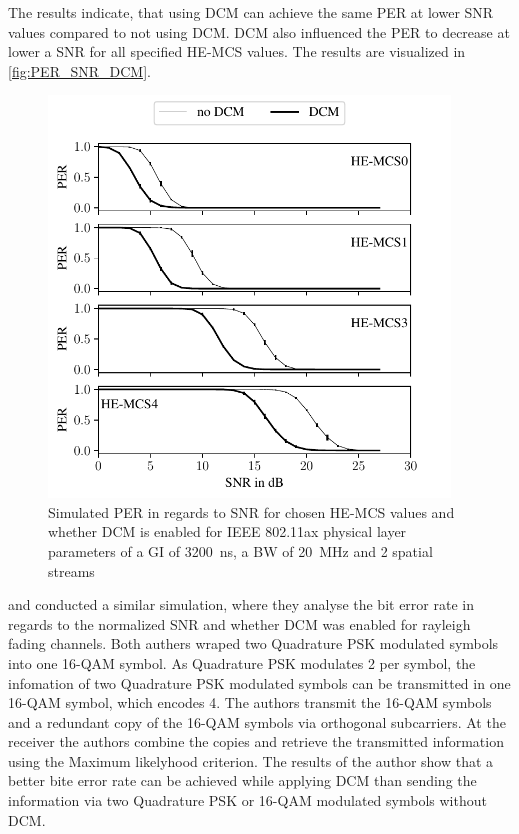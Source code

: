 The results indicate, that using \ac{DCM} can achieve the same \ac{PER} at lower \ac{SNR} values compared to not using \ac{DCM}. \ac{DCM} also influenced the
\ac{PER} to decrease at lower a \ac{SNR} for all specified HE-MCS values. The results are visualized in \autoref{fig:PER_SNR_DCM}.
\begin{figure}[H]%
	\centering
	\includegraphics[width=0.95\textwidth]{figures/DCM_PER_to_SNR.pdf}
	\caption{Simulated \ac{PER} in regards to \ac{SNR} for chosen HE-\ac{MCS} values and whether \ac{DCM} is enabled for IEEE 802.11ax physical layer parameters of a \ac{GI} of \SI{3200}{\nano\second}, a \ac{BW} of \SI{20}{\mega\hertz} and 2 spatial streams}%
	\label{fig:PER_SNR_DCM}%
\end{figure}


\Textcite{ryu_ber_2010} and \textcite{park_ber_2006} conducted a similar simulation, where they analyse the bit error rate in
regards to the normalized \ac{SNR} and whether \ac{DCM} was enabled for rayleigh fading channels. Both authers wraped two
Quadrature \ac{PSK} modulated symbols into one 16-\ac{QAM} symbol. As Quadrature \ac{PSK} modulates \SI{2}{\bit} per symbol, the infomation
of two Quadrature \ac{PSK} modulated symbols can be
transmitted in one 16-\ac{QAM} symbol, which encodes \SI{4}{\bit}. The authors transmit the 16-\ac{QAM} symbols and a redundant copy
of the 16-\ac{QAM} symbols via orthogonal subcarriers. At the receiver the authors combine the copies and retrieve the transmitted
information using the Maximum likelyhood criterion. The results of the author show that a better bite error rate can be achieved while applying
\ac{DCM} than sending the information via two Quadrature \ac{PSK} or 16-\ac{QAM} modulated symbols without \ac{DCM}.


